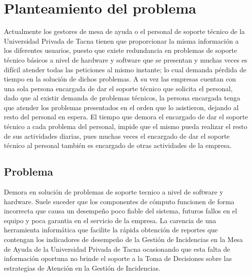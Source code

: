 \documentclass[preprint,12pt]{elsarticle}
\begin{document}


\section{Planteamiento del problema}
Actualmente los gestores de mesa de ayuda o el personal de soporte técnico de la Universidad Privada de Tacna tienen que proporcionar la misma información a los diferentes usuarios, puesto que existe redundancia en problemas de soporte técnico básicos a nivel de hardware y software que se presentan y muchas veces es difícil atender todas las peticiones al mismo instante; lo cual demanda pérdida de tiempo en la solución de dichos problemas. A su vez las empresas  cuentan con una sola persona encargada de dar el soporte técnico que solicita el personal, dado que al existir demanda de problemas técnicos, la persona encargada tenga que atender los problemas presentados en el orden que lo asistieron, dejando al resto del personal en espera. El tiempo que demora el encargado de dar el soporte técnico a cada problema del personal, impide que el mismo pueda realizar el resto de sus actividades diarias, pues muchas veces el encargado de dar el soporte técnico al personal también es encargado de otras actividades de la empresa. 


\subsection {\textbf{Problema}}
Demora en solución de problemas de soporte tecnico a nivel de software y hardware. Suele suceder que los componentes de cómputo funcionen de forma incorrecta que causa un desempeño poco fiable del sistema, futuros fallos en el equipo y poca garantia en el servicio de la empresa. La carencia de una herramienta informática que facilite la rápida obtención de reportes que contengan los indicadores de desempeño de la Gestión de Incidencias en la Mesa de Ayuda de la Universidad Privada de Tacna ocasionando que esta falta de información oportuna no brinde el soporte a la Toma de Decisiones sobre las estrategias de Atención en la Gestión de Incidencias.

\end{document}
